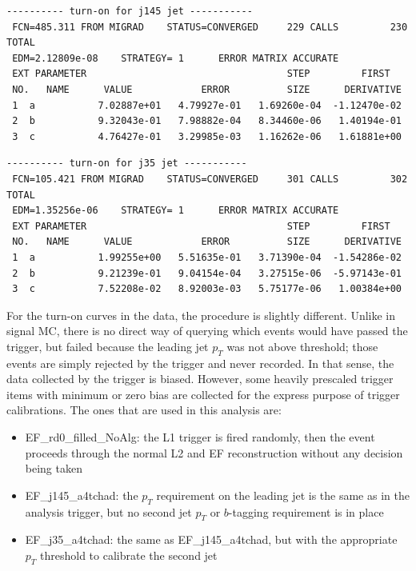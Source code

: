 \scriptsize
\begin{verbatim}
---------- turn-on for j145 jet -----------
 FCN=485.311 FROM MIGRAD    STATUS=CONVERGED     229 CALLS         230 TOTAL
 EDM=2.12809e-08    STRATEGY= 1      ERROR MATRIX ACCURATE 
 EXT PARAMETER                                   STEP         FIRST   
 NO.   NAME      VALUE            ERROR          SIZE      DERIVATIVE 
 1  a           7.02887e+01   4.79927e-01   1.69260e-04  -1.12470e-02
 2  b           9.32043e-01   7.98882e-04   8.34460e-06   1.40194e-01
 3  c           4.76427e-01   3.29985e-03   1.16262e-06   1.61881e+00
\end{verbatim}

\scriptsize
\begin{verbatim}
---------- turn-on for j35 jet -----------
 FCN=105.421 FROM MIGRAD    STATUS=CONVERGED     301 CALLS         302 TOTAL
 EDM=1.35256e-06    STRATEGY= 1      ERROR MATRIX ACCURATE 
 EXT PARAMETER                                   STEP         FIRST   
 NO.   NAME      VALUE            ERROR          SIZE      DERIVATIVE 
 1  a           1.99255e+00   5.51635e-01   3.71390e-04  -1.54286e-02
 2  b           9.21239e-01   9.04154e-04   3.27515e-06  -5.97143e-01
 3  c           7.52208e-02   8.92003e-03   5.75177e-06   1.00384e+00
\end{verbatim}

\normalsize

For the turn-on curves in the data, the procedure is slightly different.  Unlike in signal
MC, there is no direct way of querying which events would have passed the trigger, but failed
because the leading jet $p_T$ was not above threshold; those events are simply rejected by 
the trigger and never recorded.  In that sense, the data collected by the trigger is biased.
However, some heavily prescaled trigger items with minimum or zero bias are collected for 
the express purpose of trigger calibrations.  The ones that are used in this analysis are:

\begin{itemize}
    \item EF\_rd0\_filled\_NoAlg: the L1 trigger is fired randomly, then the event proceeds
    through the normal L2 and EF reconstruction without any decision being taken
    \item EF\_j145\_a4tchad: the $p_T$ requirement on the leading jet is the same as in 
    the analysis trigger, but no second jet $p_T$ or $b$-tagging requirement is in place
    \item EF\_j35\_a4tchad: the same as EF\_j145\_a4tchad, but with the appropriate $p_T$ 
    threshold to calibrate the second jet
\end{itemize}

